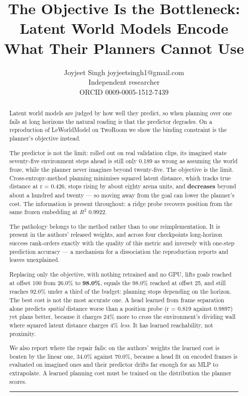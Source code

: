 \documentclass[10pt]{article}
\title{The Objective Is the Bottleneck: Latent World Models Encode What Their Planners Cannot Use}
\author{\name Joyjeet Singh \email joyjeetsingh1@gmail.com \\
      \addr Independent researcher \\ ORCID 0009-0005-1512-7439}
\begin{document}
\maketitle

\begin{abstract}
Latent world models are judged by how well they predict, so when planning over
one fails at long horizons the natural reading is that the predictor degrades.
On a reproduction of LeWorldModel on TwoRoom we show the binding constraint is
the planner's objective instead.

The predictor is not the limit: rolled out on real validation clips, its
imagined state seventy-five environment steps ahead is still only 0.189 as
wrong as assuming the world froze, while the planner never imagines beyond
twenty-five. The objective is the limit. Cross-entropy-method planning
minimises squared latent distance, which tracks true distance at r = 0.426,
stops rising by about eighty arena units, and \textbf{decreases} beyond about a
hundred and twenty --- so moving away from the goal can lower the planner's
cost. The information is present throughout: a ridge probe recovers position
from the same frozen embedding at $R^{2}$ 0.9922.

The pathology belongs to the method rather than to one reimplementation. It is
present in the authors' released weights, and across four checkpoints
long-horizon success rank-orders exactly with the quality of this metric and
inversely with one-step prediction accuracy --- a mechanism for a dissociation
the reproduction reports and leaves unexplained.

Replacing only the objective, with nothing retrained and no GPU, lifts goals
reached at offset 100 from 26.0\% to \textbf{98.0\%}, equals the 98.0\% reached at
offset 25, and still reaches 92.0\% under a third of the budget: planning stops
depending on the horizon. The best cost is not the most accurate one. A head
learned from frame separation alone predicts \emph{spatial} distance worse than a
position probe (r = 0.819 against 0.9897) yet plans better, because it charges
24\% more to cross the environment's dividing wall where squared latent
distance charges 4\% \emph{less}. It has learned reachability, not proximity.

We also report where the repair fails: on the authors' weights the learned
cost is beaten by the linear one, 34.0\% against 70.0\%, because a head fit on
encoded frames is evaluated on imagined ones and their predictor drifts far
enough for an MLP to extrapolate. A learned planning cost must be trained on
the distribution the planner scores.

\begin{center}\rule{0.5\linewidth}{0.5pt}\end{center}
\end{abstract}
\end{document}
